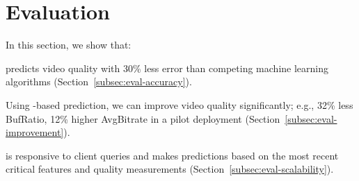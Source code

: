 \section{Evaluation}
\label{sec:cfa:eval}


In this section, we show that:
\begin{packeditemize}
\item \dda  predicts video quality with 30\% less error than 
competing machine learning algorithms 
(Section~\ref{subsec:eval-accuracy}).
\item Using \dda-based prediction, we can improve  
video quality significantly; e.g., 32\% less BufRatio, 
12\% higher AvgBitrate in a pilot deployment 
(Section~\ref{subsec:eval-improvement}).
\item \dda is responsive to client  queries and  makes 
predictions based on the most recent critical features 
and quality measurements 
(Section~\ref{subsec:eval-scalability}).
\end{packeditemize}




